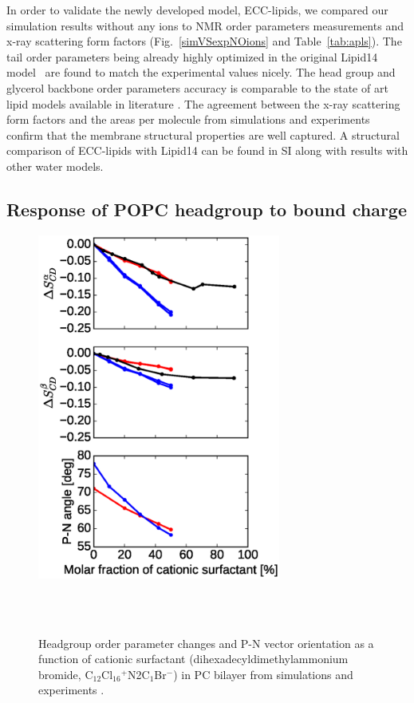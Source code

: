 \documentclass[aip,jcp,twocolumn]{revtex4}
\begin{document}
In order to validate the newly developed model, ECC-lipids, 
we compared our simulation results without any ions to
NMR order parameters measurements and x-ray scattering form factors 
(Fig.~\ref{simVSexpNOions} and Table~\ref{tab:apls}). 
The tail order parameters being already highly optimized in the original Lipid14 model~\cite{dickson14}
are found to match the experimental values nicely.
The head group and glycerol backbone order parameters accuracy is 
comparable to the state of art lipid models available in literature \cite{ollila16}.
The agreement between the x-ray scattering form factors and the areas per molecule from simulations and experiments
confirm that the membrane structural properties are well captured. 
A structural comparison of ECC-lipids with Lipid14 can be found 
in SI along with results with other water models. 

\subsection{Response of POPC headgroup to bound charge}

\begin{figure}[tbp]
  \centering
  \includegraphics[width=8.0cm]{../Fig/ipython_nb/PN_angle_OrdPars-A-B_L14-ECCL17_q80_sig89_surf.eps}
  \caption{\label{OrderParameterCHANGESsurf}
    Headgroup order parameter changes and P-N vector orientation as a function of
    cationic surfactant (dihexadecyldimethylammonium bromide, C$_{12}$Cl$_{16}$$^+$N2C$_1$Br$^-$)
    in PC bilayer from simulations and experiments \cite{scherer89}.
  }
   \\
   \\
\end{figure}
\end{document}
